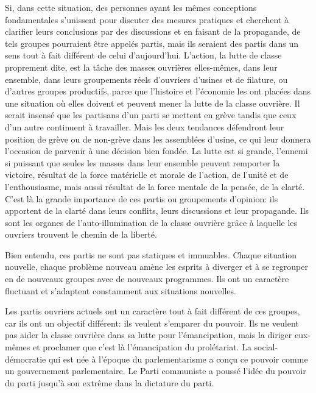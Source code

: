 Si, dans cette situation, des personnes ayant les mêmes conceptions fondamentales s’unissent pour discuter des mesures pratiques et cherchent à clarifier leurs conclusions par des discussions et en faisant de la propagande, de tels groupes pourraient être appelés partis, mais ils seraient des partis dans un sens tout à fait différent de celui d’aujourd’hui. L'action, la lutte de classe proprement dite, est la tâche des masses ouvrières elles-mêmes, dans leur ensemble, dans leurs groupements réels d'ouvriers d'usines et de filature, ou d'autres groupes productifs, parce que l'histoire et l'économie les ont placées dans une situation où elles doivent et peuvent mener la lutte de la classe ouvrière. Il serait insensé que les partisans d'un parti se mettent en grève tandis que ceux d'un autre continuent à travailler. Mais les deux tendances défendront leur position de grève ou de non-grève dans les assemblées d'usine, ce qui leur donnera l'occasion de parvenir à une décision bien fondée. La lutte est si grande, l'ennemi si puissant que seules les masses dans leur ensemble peuvent remporter la victoire, résultat de la force matérielle et morale de l'action, de l'unité et de l'enthousiasme, mais aussi résultat de la force mentale de la pensée, de la clarté. C'est là la grande importance de ces partis ou groupements d'opinion: ils apportent de la clarté dans leurs conflits, leurs discussions et leur propagande. Ils sont les organes de l'auto-illumination de la classe ouvrière grâce à laquelle les ouvriers trouvent le chemin de la liberté.

Bien entendu, ces partis ne sont pas statiques et immuables. Chaque situation nouvelle, chaque problème nouveau amène les esprits à diverger et à se regrouper en de nouveaux groupes avec de nouveaux programmes. Ils ont un caractère fluctuant et s'adaptent constamment aux situations nouvelles.

Les partis ouvriers actuels ont un caractère tout à fait différent de ces groupes, car ils ont un objectif différent: ils veulent s'emparer du pouvoir. Ils ne veulent pas aider la classe ouvrière dans sa lutte pour l'émancipation, mais la diriger eux-mêmes et proclamer que c'est là l'émancipation du prolétariat. La social-démocratie qui est née à l'époque du parlementarisme a conçu ce pouvoir comme un gouvernement parlementaire. Le Parti communiste a poussé l'idée du pouvoir du parti jusqu'à son extrême dans la dictature du parti.

